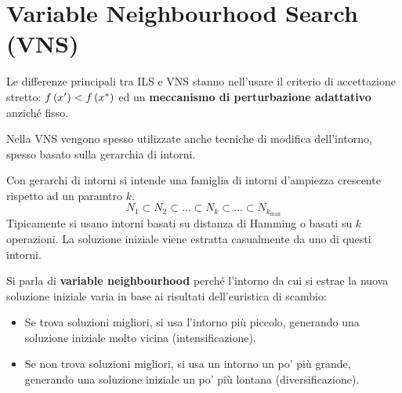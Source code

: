 \documentclass[\main/main.tex]{subfiles}
\begin{document}
\section{Variable Neighbourhood Search (VNS)}
\begin{multicols}{2}
\begin{observation}
    Le differenze principali tra ILS e VNS stanno nell'usare il criterio di accettazione stretto: \(f\left(x'\right) < f\left(x^*\right)\) ed un \textbf{meccanismo di perturbazione adattativo} anziché fisso.

    Nella VNS vengono spesso utilizzate anche tecniche di modifica dell'intorno, spesso basato sulla gerarchia di intorni.
\end{observation}

\begin{definition}
    Con gerarchi di intorni si intende una famiglia di intorni d'ampiezza crescente rispetto ad un paramtro \(k\).
    \[
        N_1 \subset N_2 \subset \ldots \subset N_k \subset \ldots \subset N_{k_{\max}}
    \]
    Tipicamente si usano intorni basati su distanza di Hamming o basati su \(k\) operazioni. La soluzione iniziale viene estratta casualmente da uno di questi intorni.
\end{definition}
\begin{definition}
    Si parla di \textbf{variable neighbourhood} perché l'intorno da cui si estrae la nuova soluzione iniziale varia in base ai risultati dell'euristica di scambio:
    \begin{itemize}
        \item Se trova soluzioni migliori, si usa l'intorno più piccolo, generando una soluzione iniziale molto vicina (intensificazione).
        \item Se non trova soluzioni migliori, si usa un intorno un po' più grande, generando una soluzione iniziale un po' più lontana (diversificazione).
    \end{itemize}
    

\end{definition}
\end{multicols}
\end{document}
